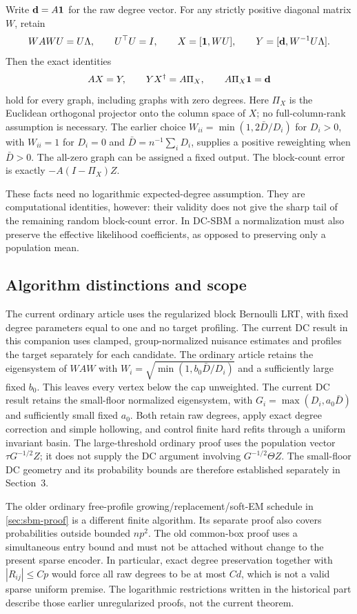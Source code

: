 Write $\mathbf d=A\mathbf 1$ for the raw degree vector. For any strictly
positive diagonal matrix $W$, retain
\[
 WAWU=U\Lambda,\qquad U^\top U=I,\qquad
 X=[\mathbf 1,WU],\qquad Y=[\mathbf d,W^{-1}U\Lambda].
\]
Then the exact identities
\begin{equation}\label{eq:sparse-old-action}
 AX=Y,\qquad YX^\dagger=A\Pi_X,\qquad A\Pi_X\mathbf 1=\mathbf d
\end{equation}
hold for every graph, including graphs with zero degrees. Here $\Pi_X$
is the Euclidean orthogonal projector onto the column space of $X$;
no full-column-rank assumption is necessary. The earlier choice
$W_{ii}=\min(1,2\bar D/D_i)$ for $D_i>0$, with $W_{ii}=1$ for
$D_i=0$ and $\bar D=n^{-1}\sum_iD_i$, supplies a positive reweighting
when $\bar D>0$. The all-zero graph can be assigned a fixed output.
The block-count error is exactly $-A(I-\Pi_X)Z$.

These facts need no logarithmic expected-degree assumption. They are
computational identities, however: their validity does not give the
sharp tail of the remaining random block-count error. In DC-SBM a
normalization must also preserve the effective likelihood coefficients,
as opposed to preserving only a population mean.


\subsection{Algorithm distinctions and scope}
The current ordinary article uses the regularized block Bernoulli LRT,
with fixed degree parameters equal to one and no target profiling.
The current DC result in this companion uses clamped, group-normalized
nuisance estimates and profiles the target separately for each candidate.
The ordinary article retains the eigensystem of $WAW$ with
$W_i=\sqrt{\min(1,b_0\bar D/D_i)}$ and a sufficiently large fixed
$b_0$. This leaves every vertex below the cap unweighted. The current
DC result retains the small-floor normalized eigensystem, with
$G_i=\max(D_i,a_0\bar D)$ and sufficiently small fixed $a_0$.
Both retain raw degrees, apply exact degree correction and simple
hollowing, and control finite hard refits through a uniform invariant
basin. The large-threshold ordinary proof uses the population vector
$\tau G^{-1/2}Z$; it does not supply the DC argument involving
$G^{-1/2}\Theta Z$. The small-floor DC geometry and its probability
bounds are therefore established separately in Section~3.

The older ordinary free-profile growing/replacement/soft-EM schedule
in \cref{sec:sbm-proof} is a different finite algorithm. Its separate
proof also covers probabilities outside bounded $np^2$. The old common-box
proof uses a simultaneous entry bound and must not be attached without
change to the present sparse encoder. In particular, exact degree
preservation together with $|R_{ij}|\le Cp$ would force all raw degrees
to be at most $Cd$, which is not a valid sparse uniform premise.
The logarithmic restrictions written in the historical part describe
those earlier unregularized proofs, not the current theorem.

